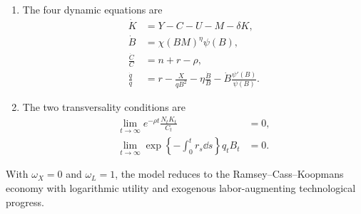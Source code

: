 \begin{definition}[Equilibrium]
\begin{enumerate}
\item The four dynamic equations are
\begin{subequations}
\label{eq:rewrite-equilibrium-dynamics}
\begin{align}
 \dot K&=Y-C-U-M-\delta K,
 \label{eq:rewrite-eq-kdot}\\
 \dot B&=\chi(BM)^\eta\psi(B),
 \label{eq:rewrite-eq-bdot}\\
 \frac{\dot C}{C}&=n+r-\rho,
 \label{eq:rewrite-eq-cdot}\\
 \frac{\dot q}{q}&=r-\frac{X}{qB^2}-\eta\frac{\dot B}{B}
 -\dot B\frac{\psi'(B)}{\psi(B)}.
 \label{eq:rewrite-eq-qdot}
\end{align}
\end{subequations}
\item The two transversality conditions are
\begin{subequations}
\label{eq:rewrite-equilibrium-tvcs}
\begin{align}
 \lim_{t\to\infty}e^{-\rho t}\frac{N_tK_t}{C_t}&=0,
 \label{eq:rewrite-eq-household-tvc}\\
 \lim_{t\to\infty}
 \exp\left\{-\int_0^t r_s\dd s\right\}q_tB_t&=0.
 \label{eq:rewrite-eq-developer-tvc}
\end{align}
\end{subequations}
\end{enumerate}
\end{definition}

\begin{remark}
\label{rem:rewrite-no-ai}
With $\omega_X=0$ and $\omega_L=1$, the model reduces to the
Ramsey--Cass--Koopmans economy with logarithmic utility and exogenous
labor-augmenting technological progress.
\end{remark}

